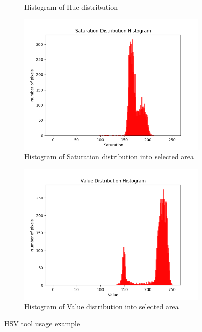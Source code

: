 \documentclass{ctuthesis}
\begin{document}
\begin{figure}[htbp]
\begin{subfigure}{0.475\textwidth}
         \caption{Histogram of Hue distribution }
         \label{fig: hsv b}
     \end{subfigure}
          \hfill
     \begin{subfigure}{0.475\textwidth}
         \centering
         \includegraphics[width=\textwidth]{HSV_S.png}
         \caption{Histogram of Saturation distribution into selected area}
         \label{fig: hsv c}
     \end{subfigure}
          \hfill
     \begin{subfigure}{0.475\textwidth}
         \centering
         \includegraphics[width=\textwidth]{HSV_V.png}
         \caption{Histogram of Value distribution into selected area}
         \label{fig: hsv d}
     \end{subfigure}

        \caption{HSV tool usage example}
        \label{fig: hsv-tool}
\end{figure}
\end{document}
